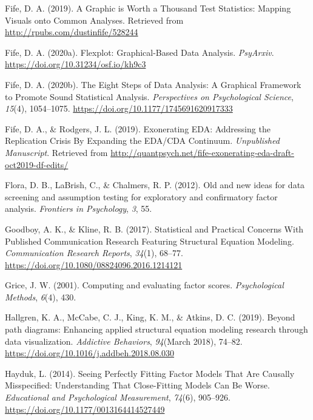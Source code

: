 \documentclass[
  english,
  doc]{apa6}
\newlength{\cslhangindent}
\newenvironment{cslreferences}%
  {\setlength{\parindent}{0pt}%
  \everypar{\setlength{\hangindent}{\cslhangindent}}\ignorespaces}%
  {\par}
\begin{document}
\begin{cslreferences}
\leavevmode\hypertarget{ref-Fife2019b}{}%
Fife, D. A. (2019). A Graphic is Worth a Thousand Test Statistics: Mapping Visuals onto Common Analyses. Retrieved from \url{http://rpubs.com/dustinfife/528244}

\leavevmode\hypertarget{ref-Fife2019c}{}%
Fife, D. A. (2020a). Flexplot: Graphical-Based Data Analysis. \emph{PsyArxiv}. \url{https://doi.org/10.31234/osf.io/kh9c3}

\leavevmode\hypertarget{ref-Fife2019e}{}%
Fife, D. A. (2020b). The Eight Steps of Data Analysis: A Graphical Framework to Promote Sound Statistical Analysis. \emph{Perspectives on Psychological Science}, \emph{15}(4), 1054--1075. \url{https://doi.org/10.1177/1745691620917333}

\leavevmode\hypertarget{ref-Fife2019a}{}%
Fife, D. A., \& Rodgers, J. L. (2019). Exonerating EDA: Addressing the Replication Crisis By Expanding the EDA/CDA Continuum. \emph{Unpublished Manuscript}. Retrieved from \url{http://quantpsych.net/fife-exonerating-eda-draft-oct2019-df-edits/}

\leavevmode\hypertarget{ref-flora2012old}{}%
Flora, D. B., LaBrish, C., \& Chalmers, R. P. (2012). Old and new ideas for data screening and assumption testing for exploratory and confirmatory factor analysis. \emph{Frontiers in Psychology}, \emph{3}, 55.

\leavevmode\hypertarget{ref-Goodboy2017}{}%
Goodboy, A. K., \& Kline, R. B. (2017). Statistical and Practical Concerns With Published Communication Research Featuring Structural Equation Modeling. \emph{Communication Research Reports}, \emph{34}(1), 68--77. \url{https://doi.org/10.1080/08824096.2016.1214121}

\leavevmode\hypertarget{ref-grice2001computing}{}%
Grice, J. W. (2001). Computing and evaluating factor scores. \emph{Psychological Methods}, \emph{6}(4), 430.

\leavevmode\hypertarget{ref-Hallgren2019a}{}%
Hallgren, K. A., McCabe, C. J., King, K. M., \& Atkins, D. C. (2019). Beyond path diagrams: Enhancing applied structural equation modeling research through data visualization. \emph{Addictive Behaviors}, \emph{94}(March 2018), 74--82. \url{https://doi.org/10.1016/j.addbeh.2018.08.030}

\leavevmode\hypertarget{ref-Hayduk2014}{}%
Hayduk, L. (2014). Seeing Perfectly Fitting Factor Models That Are Causally Misspecified: Understanding That Close-Fitting Models Can Be Worse. \emph{Educational and Psychological Measurement}, \emph{74}(6), 905--926. \url{https://doi.org/10.1177/0013164414527449}


\end{cslreferences}
\end{document}
